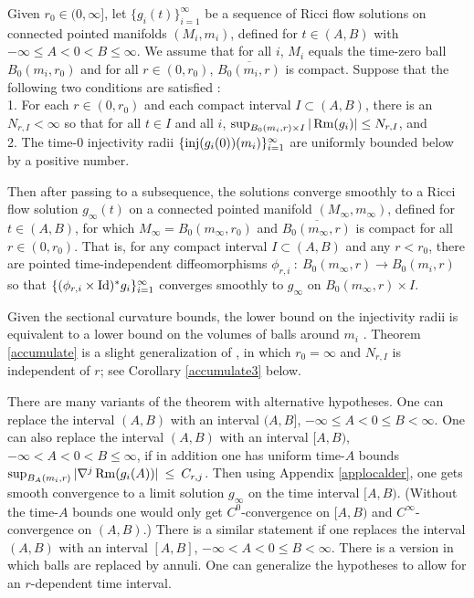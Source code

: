 \begin{theorem}
  \label{thm:kl-convergent-subsequences-ricci-flow-solutions-existence-convergent-subsequences-ricci-flow-solutions}

\label{accumulate}
Given $r_0 \in (0, \infty]$,
let $\{g_i(t)\}_{i=1}^\infty$ be a sequence of Ricci flow solutions
on connected pointed manifolds $(M_i, m_i)$,
defined for $t \in (A, B)$ with $-\infty \le A < 0 < B \le \infty$.
We assume that for all $i$, $M_i$ equals the time-zero ball $B_0(m_i, r_0)$
and for all $r \in (0, r_0)$, $\overline{B_0(m_i, r)}$ is compact.
Suppose that the following
two conditions are satisfied : \\
1. For each $r \in (0, r_0)$ and each compact interval $I \subset (A,B)$,
there is an $N_{r,I} < \infty$ so that for all $t \in I$ and all $i$,
$\sup_{B_0(m_i, r) \times I} |\operatorname{Rm}(g_i)| \le N_{r,I}$, and \\
2. The
time-$0$ injectivity radii
$\{\operatorname{inj}(g_i(0))(m_i)\}_{i=1}^\infty$
are uniformly bounded below by a positive number.

Then after passing to a subsequence, the solutions converge smoothly
to a
Ricci flow solution $g_\infty(t)$ on a connected pointed manifold
$(M_\infty, m_\infty)$, defined for
$t \in (A, B)$, for which $M_\infty = B_0(m_\infty, r_0)$ and
$\overline{B_0(m_\infty, r)}$ is compact for all $r \in (0, r_0)$.
That is, for any compact interval $I \subset (A, B)$
and any $r < r_0$,
there are pointed
time-independent diffeomorphisms $\phi_{r,i} \: : \:
B_0(m_\infty, r) \rightarrow B_0(m_i,r)$ so that
$\{(\phi_{r,i} \times \operatorname{Id})^* g_i\}_{i=1}^\infty$  converges smoothly
to $g_\infty$ on $B_0(m_\infty, r) \times I$.
\end{theorem}

Given the sectional curvature bounds, the lower
bound on the injectivity radii is equivalent to a lower bound
on the volumes of balls around $m_i$
\cite[Theorem 4.7]{Cheeger-Gromov-Taylor}.
Theorem \ref{accumulate} is a slight generalization of
\cite[Main Theorem]{Hamiltonnn}, in which $r_0 = \infty$ and
$N_{r,I}$ is independent of $r$; see Corollary \ref{accumulate3}
below.

There are many variants of the theorem with alternative hypotheses.
One can replace the interval $(A,B)$ with an interval $(A, B]$,
$-\infty \le A < 0 \le B < \infty$.
One can also replace the interval $(A, B)$ with an interval
$[A, B)$, $-\infty < A< 0 < B
\le \infty$, if in addition one has uniform time-$A$ bounds
$\sup_{B_A(m_i, r)} |\nabla^j \operatorname{Rm}(g_i(A))| \: \le \: C_{r, j}$.
Then using Appendix \ref{applocalder},
one gets smooth convergence to a limit solution $g_\infty$
on the time interval $[A, B)$.
(Without the time-$A$ bounds one would only get
$C^0$-convergence on $[A, B)$ and $C^\infty$-convergence
on $(A, B)$.)
There is a similar statement if
one replaces the interval $(A, B)$ with an interval
$[A, B]$, $-\infty < A< 0 \le B
< \infty$. There is a version in which balls are replaced
by annuli. One can generalize the hypotheses to allow for
an $r$-dependent time interval.

